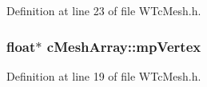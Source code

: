 Definition at line 23 of file WTcMesh.h.

\hypertarget{classc_mesh_array_a4dce50ad6de11940afa0af53fdcefc27}{
\subsubsection[{mpVertex}]{\setlength{\rightskip}{0pt plus 5cm}float$\ast$ {\bf cMeshArray::mpVertex}}}
\label{classc_mesh_array_a4dce50ad6de11940afa0af53fdcefc27}


Definition at line 19 of file WTcMesh.h.

